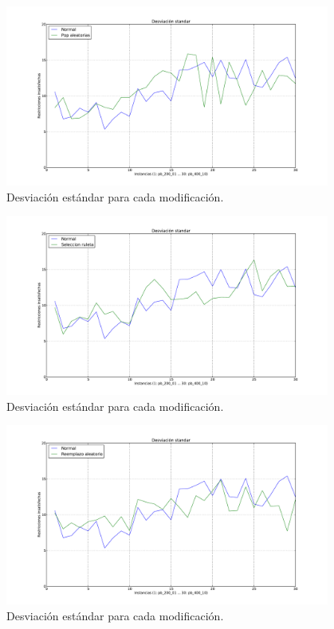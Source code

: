 \begin{figure}[h!]
\begin{center}
\includegraphics[width=0.95\textwidth]{img/s-1.pdf}
\end{center}
\caption{Desviación estándar para cada modificación.}
\label{fig:s-1}
\end{figure}

\begin{figure}[h!]
\begin{center}
\includegraphics[width=0.95\textwidth]{img/s-2.pdf}
\end{center}
\caption{Desviación estándar para cada modificación.}
\label{fig:s-2}
\end{figure}

\begin{figure}[h!]
\begin{center}
\includegraphics[width=0.95\textwidth]{img/s-3.pdf}
\end{center}
\caption{Desviación estándar para cada modificación.}
\label{fig:s-3}
\end{figure}

